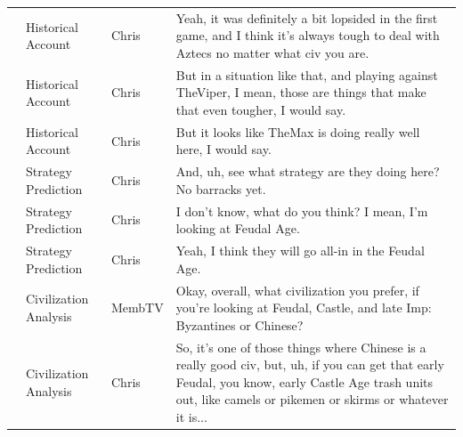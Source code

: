 {\begin{longtable}{@{}>{\theAppRow}r|L{2.3cm}L{1.0cm}U{11.55cm}@{}}
    & Historical Account    & Chris        & Yeah, it was definitely a bit lopsided in the first game, and I think it's always tough to deal with Aztecs no matter what civ you are.                                                                                                                          \\
    & Historical Account    & Chris        & But in a situation like that, and playing against TheViper, I mean, those are things that make that even tougher, I would say.                                                                                                                                   \\
    & Historical Account    & Chris        & But it looks like TheMax is doing really well here, I would say.                                                                                                                                                                                                 \\
    & Strategy Prediction   & Chris        & And, uh, see what strategy are they doing here? No barracks yet.                                                                                                                                                                                                 \\
    & Strategy Prediction   & Chris        & I don't know, what do you think? I mean, I'm looking at Feudal Age.                                                                                                                                                                                              \\
    & Strategy Prediction   & Chris        & Yeah, I think they will go all-in in the Feudal Age.                                                                                                                                                                                                             \\
    & Civilization Analysis & MembTV       & Okay, overall, what civilization you prefer, if you're looking at Feudal, Castle, and late Imp: Byzantines or Chinese?                                                                                                                                           \\
    & Civilization Analysis & Chris        & So, it's one of those things where Chinese is a really good civ, but, uh, if you can get that early Feudal, you know, early Castle Age trash units out, like camels or pikemen or skirms or whatever it is...                                                    \\

\end{longtable}}
